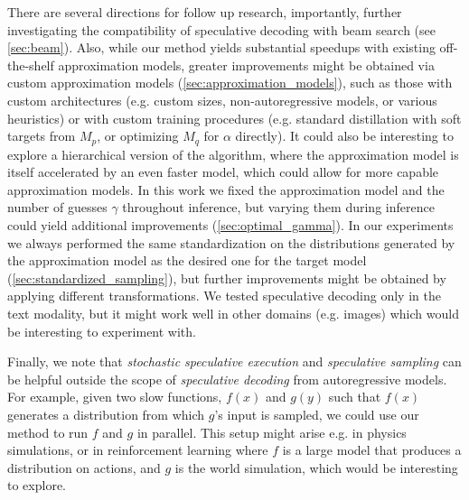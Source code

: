 There are several directions for follow up research, importantly, further investigating the compatibility of speculative decoding with beam search (see \ref{sec:beam}).
Also, while our method yields substantial speedups with existing off-the-shelf approximation models, greater improvements might be obtained via custom approximation models (\ref{sec:approximation_models}), such as those with custom architectures (e.g. custom sizes, non-autoregressive models, or various heuristics) or with custom training procedures (e.g. standard distillation with soft targets from $M_p$, or optimizing $M_q$ for $\alpha$ directly). It could also be interesting to explore a hierarchical version of the algorithm, where the approximation model is itself accelerated by an even faster model, which could allow for more capable approximation models. In this work we fixed the approximation model and the number of guesses $\gamma$ throughout inference, but varying them during inference could yield additional improvements (\ref{sec:optimal_gamma}).
In our experiments we always performed the same standardization on the distributions generated by the approximation model as the desired one for the target model (\ref{sec:standardized_sampling}), but further improvements might be obtained by applying different transformations. We tested speculative decoding only in the text modality, but it might work well in other domains (e.g. images) which would be interesting to experiment with.

Finally, we note that \emph{stochastic speculative execution} and \emph{speculative sampling} can be helpful outside the scope of \emph{speculative decoding} from autoregressive models. For example, given two slow functions, $f(x)$ and $g(y)$ such that $f(x)$ generates a distribution from which $g$'s input is sampled, we could use our method to run $f$ and $g$ in parallel. This setup might arise e.g. in physics simulations, or in reinforcement learning where $f$ is a large model that produces a distribution on actions, and $g$ is the world simulation, which would be interesting to explore.


